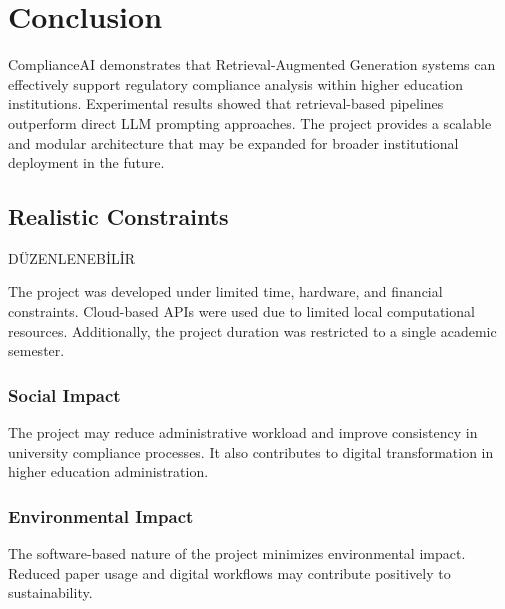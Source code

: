 \documentclass[a4paper,12pt]{article}
\begin{document}

\section{Conclusion}

\hspace{0.5cm} ComplianceAI demonstrates that Retrieval-Augmented Generation systems can effectively support regulatory compliance analysis within higher education institutions. Experimental results showed that retrieval-based pipelines outperform direct LLM prompting approaches. The project provides a scalable and modular architecture that may be expanded for broader institutional deployment in the future.


\subsection{Realistic Constraints}
DÜZENLENEBİLİR

\hspace{0.5cm} The project was developed under limited time, hardware, and financial constraints. Cloud-based APIs were used due to limited local computational resources. Additionally, the project duration was restricted to a single academic semester.

\subsubsection{Social Impact}

\hspace{0.5cm} The project may reduce administrative workload and improve consistency in university compliance processes. It also contributes to digital transformation in higher education administration.

\subsubsection{Environmental Impact}

\hspace{0.5cm} The software-based nature of the project minimizes environmental impact. Reduced paper usage and digital workflows may contribute positively to sustainability.
\end{document}

